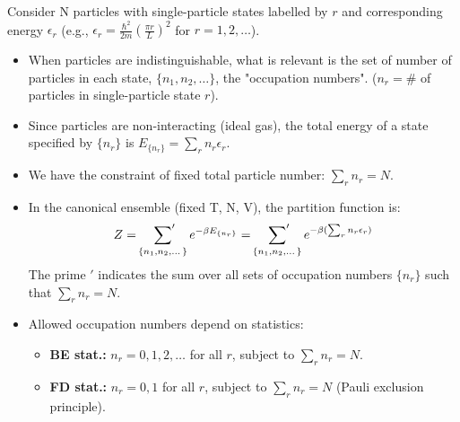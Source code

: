 \documentclass[11pt]{article}
\newcommand{\partfn}{Z} %
\newcommand{\eps}{\epsilon}
\begin{document}
Consider N particles with single-particle states labelled by $r$ and corresponding energy $\eps_r$ (e.g., $\eps_r = \frac{\hbar^2}{2m}(\frac{\pi r}{L})^2$ for $r=1, 2, \dots$).
\begin{itemize}
    \item When particles are indistinguishable, what is relevant is the set of number of particles in each state, $\{n_1, n_2, \dots\}$, the "occupation numbers". ($n_r = \#$ of particles in single-particle state $r$).
    \item Since particles are non-interacting (ideal gas), the total energy of a state specified by $\{n_r\}$ is $E_{\{n_r\}} = \sum_r n_r \eps_r$.
    \item We have the constraint of fixed total particle number: $\sum_r n_r = N$.
    \item In the canonical ensemble (fixed T, N, V), the partition function is:
    \[ \partfn = \sideset{}{'}\sum_{\{n_1, n_2, \dots\}} e^{-\beta E_{\{n_r\}}} = \sideset{}{'}\sum_{\{n_1, n_2, \dots\}} e^{-\beta (\sum_r n_r \eps_r)} \]
    The prime $'$ indicates the sum over all sets of occupation numbers $\{n_r\}$ such that $\sum_r n_r = N$.
    \item Allowed occupation numbers depend on statistics:
    \begin{itemize}
        \item \textbf{BE stat.:} $n_r = 0, 1, 2, \dots$ for all $r$, subject to $\sum_r n_r = N$.
        \item \textbf{FD stat.:} $n_r = 0, 1$ for all $r$, subject to $\sum_r n_r = N$ (Pauli exclusion principle).
    \end{itemize}
\end{itemize}
\end{document}
